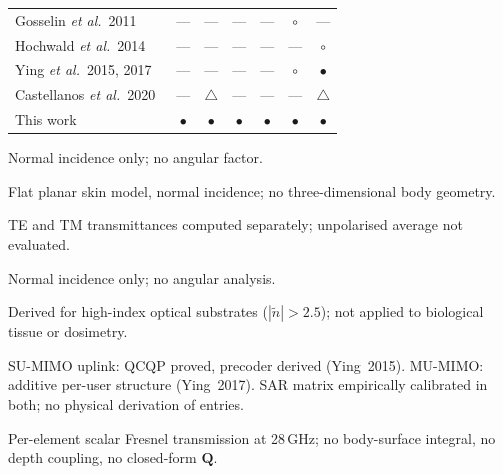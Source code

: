 \documentclass[11pt,a4paper]{article}
\theoremstyle{definition}      %
\newcommand{\ntilde}{\tilde{n}}
\begin{document}
\begin{table}[!htbp]
\begin{threeparttable}
\begin{tabularx}{\textwidth}{X
  c@{\hskip 4pt}c@{\hskip 4pt}c@{\hskip 4pt}c@{\hskip 4pt}c@{\hskip 4pt}c}
Gosselin \textit{et al.}\ 2011~\cite{Gosselin2011}
  & ---     & ---   & ---   & ---   & $\circ$ & --- \\
Hochwald \textit{et al.}\ 2014~\cite{Hochwald2014}
  & ---     & ---   & ---   & ---   & ---   & $\circ$ \\
Ying \textit{et al.}\ 2015, 2017~\cite{Ying2015,Ying2017}
  & ---     & ---   & ---   & ---   & $\circ$ & $\bullet$\tnote{6} \\
Castellanos \textit{et al.}\ 2020~\cite{Castellanos2020}
  & ---     & $\triangle$\tnote{7} & ---   & ---   & ---   & $\triangle$\tnote{7} \\
\midrule
This work
  & $\bullet$ & $\bullet$ & $\bullet$ & $\bullet$ & $\bullet$ & $\bullet$ \\
\bottomrule
\end{tabularx}
\begin{tablenotes}\footnotesize
  \item[1] Normal incidence only; no angular factor.
  \item[2] Flat planar skin model, normal incidence;
           no three-dimensional body geometry.
  \item[3] TE and TM transmittances computed separately;
           unpolarised average not evaluated.
  \item[4] Normal incidence only; no angular analysis.
  \item[5] Derived for high-index optical substrates
           ($|\ntilde|>2.5$); not applied to biological tissue
           or dosimetry.
  \item[6] SU-MIMO uplink: QCQP proved, precoder derived
           (Ying~2015).  MU-MIMO: additive per-user structure
           (Ying~2017).  SAR matrix empirically calibrated in
           both; no physical derivation of entries.
  \item[7] Per-element scalar Fresnel transmission at 28\,GHz;
           no body-surface integral, no depth coupling, no
           closed-form $\mathbf{Q}$.
\end{tablenotes}
\end{threeparttable}
\end{table}
\end{document}
